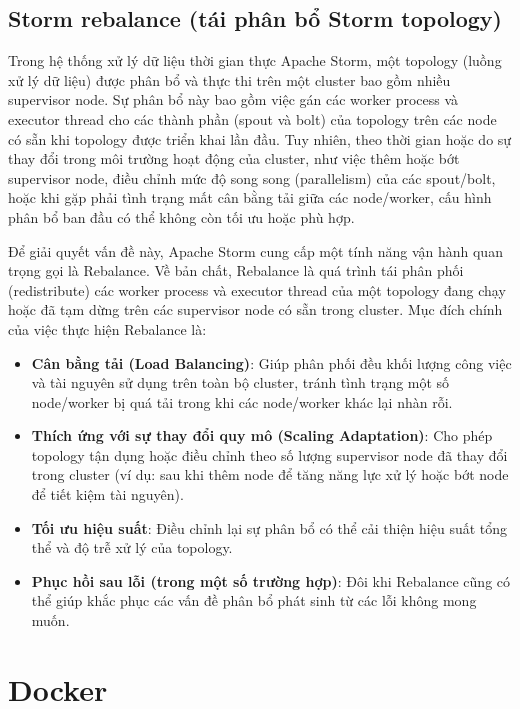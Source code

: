 \subsection{Storm rebalance (tái phân bổ Storm topology)}

Trong hệ thống xử lý dữ liệu thời gian thực Apache Storm, một topology (luồng xử lý dữ liệu) được phân bổ và thực thi trên một cluster bao gồm nhiều supervisor node. Sự phân bổ này bao gồm việc gán các worker process và executor thread cho các thành phần (spout và bolt) của topology trên các node có sẵn khi topology được triển khai lần đầu. Tuy nhiên, theo thời gian hoặc do sự thay đổi trong môi trường hoạt động của cluster, như việc thêm hoặc bớt supervisor node, điều chỉnh mức độ song song (parallelism) của các spout/bolt, hoặc khi gặp phải tình trạng mất cân bằng tải giữa các node/worker, cấu hình phân bổ ban đầu có thể không còn tối ưu hoặc phù hợp.

Để giải quyết vấn đề này, Apache Storm cung cấp một tính năng vận hành quan trọng gọi là Rebalance. Về bản chất, Rebalance là quá trình tái phân phối (redistribute) các worker process và executor thread của một topology đang chạy hoặc đã tạm dừng trên các supervisor node có sẵn trong cluster. Mục đích chính của việc thực hiện Rebalance là:

\begin{itemize}
    \item \textbf{Cân bằng tải (Load Balancing)}: Giúp phân phối đều khối lượng công việc và tài nguyên sử dụng trên toàn bộ cluster, tránh tình trạng một số node/worker bị quá tải trong khi các node/worker khác lại nhàn rỗi.
    \item \textbf{Thích ứng với sự thay đổi quy mô (Scaling Adaptation)}: Cho phép topology tận dụng hoặc điều chỉnh theo số lượng supervisor node đã thay đổi trong cluster (ví dụ: sau khi thêm node để tăng năng lực xử lý hoặc bớt node để tiết kiệm tài nguyên).
    \item \textbf{Tối ưu hiệu suất}: Điều chỉnh lại sự phân bổ có thể cải thiện hiệu suất tổng thể và độ trễ xử lý của topology.
    \item \textbf{Phục hồi sau lỗi (trong một số trường hợp)}: Đôi khi Rebalance cũng có thể giúp khắc phục các vấn đề phân bổ phát sinh từ các lỗi không mong muốn.
\end{itemize}

\section{Docker}


